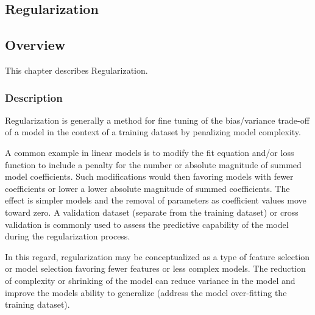 

\renewcommand{\bibsection}{\subsection{\bibname}}
\begin{bibunit}

\chapter{Regularization}
\label{ch:regularization}

\section{Overview}
This chapter describes Regularization.

\subsection{Description}
Regularization is generally a method for fine tuning of the bias/variance trade-off of a model in the context of a training dataset by penalizing model complexity.

A common example in linear models is to modify the fit equation and/or loss function to include a penalty for the number or absolute magnitude of summed model coefficients. Such modifications would then favoring models with fewer coefficients or lower a lower absolute magnitude of summed coefficients. The effect is simpler models and the removal of parameters as coefficient values move toward zero. A validation dataset (separate from the training dataset) or cross validation is commonly used to assess the predictive capability of the model during the regularization process.

In this regard, regularization may be conceptualized as a type of feature selection or model selection favoring fewer features or less complex models. The reduction of complexity or shrinking of the model can reduce variance in the model and improve the models ability to generalize (address the model over-fitting the training dataset). 


\end{bibunit}
